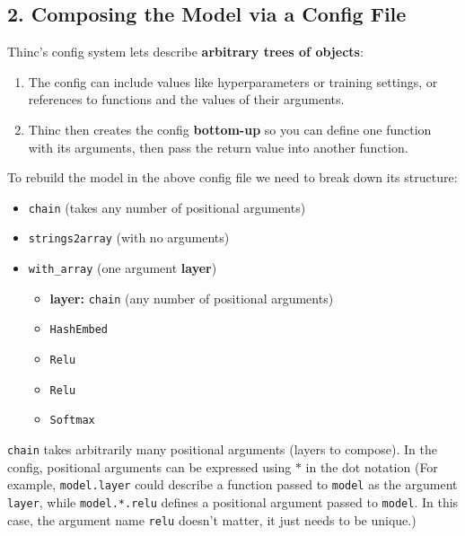 \documentclass[
]{article}
\providecommand{\tightlist}{%
  \setlength{\itemsep}{0pt}\setlength{\parskip}{0pt}}
\begin{document}
\hypertarget{composing-the-model-via-a-config-file}{%
\subsection{2. Composing the Model via a Config
File}\label{composing-the-model-via-a-config-file}}

Thinc's config system lets describe \textbf{arbitrary trees of objects}:

\begin{enumerate}
\def\labelenumi{\arabic{enumi}.}
\tightlist
\item
  The config can include values like hyperparameters or training
  settings, or references to functions and the values of their
  arguments.
\item
  Thinc then creates the config \textbf{bottom-up} so you can define one
  function with its arguments, then pass the return value into another
  function.
\end{enumerate}

To rebuild the model in the above config file we need to break down its
structure:

\begin{itemize}
\tightlist
\item
  \texttt{chain} (takes any number of positional
  arguments)
\item
  \texttt{strings2array} (with no arguments)
\item
  \texttt{with_array} (one argument \textbf{layer})

  \begin{itemize}
  \tightlist
  \item
    \textbf{layer:} \texttt{chain} (any number of
    positional arguments)
  \item
    \texttt{HashEmbed}
  \item
    \texttt{Relu}
  \item
    \texttt{Relu}
  \item
    \texttt{Softmax}
  \end{itemize}
\end{itemize}

\texttt{chain} takes arbitrarily many positional arguments
(layers to compose). In the config, positional arguments can be
expressed using \(*\) in the dot notation (For example,
\texttt{model.layer} could describe a function passed to
\texttt{model} as the argument
\texttt{layer}, while \texttt{model.*.relu}
defines a positional argument passed to \texttt{model}. In
this case, the argument name \texttt{relu} doesn't matter,
it just needs to be unique.)
\end{document}
